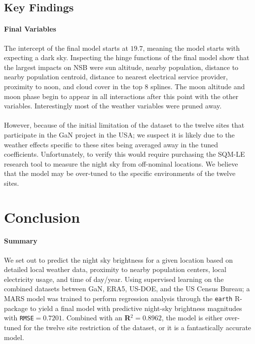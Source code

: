 \documentclass[11 pt]{article}  %
\begin{document}
\subsection{Key Findings}

\paragraph{Final Variables} The intercept of the final model starts at $19.7$,
meaning the model starts with expecting a dark sky. Inspecting the hinge 
functions of the final model show that the largest impacts on NSB were 
sun altitude, nearby population, distance to nearby population centroid, 
distance to nearest electrical service provider, proximity to noon, and cloud cover
in the top 8 splines. The moon altitude and moon phase begin to appear in all 
interactions after this point with the other variables. Interestingly
most of the weather variables were pruned away.

\paragraph{} However, because of the initial limitation of the dataset to the twelve
sites that participate in the GaN project in the USA; we suspect it is likely due to the
weather effects specific to these sites being averaged away in the tuned coefficients.
Unfortunately, to verify this would require purchasing the SQM-LE research tool to 
measure the night sky from off-nominal locations. We believe that the model may be 
over-tuned to the specific environments of the twelve sites.

\pagebreak
\section{Conclusion}


\paragraph{Summary} We set out to predict the night sky brightness for a given
location based on detailed local weather data, proximity to nearby population centers,
local electricity usage, and time of day/year. Using supervised learning on the 
combined datasets between GaN, ERA5, US-DOE, and the US Census Bureau; a MARS model
was trained to perform regression analysis through the \texttt{earth} R-package
to yield a final model with predictive night-sky brightness magnitudes with
\texttt{RMSE}$=0.7201$. Combined with an \textbf{R}$^2 = 0.8962$, the model is 
either over-tuned for the twelve site restriction of the dataset, or it is a 
fantastically accurate model.
\end{document}
